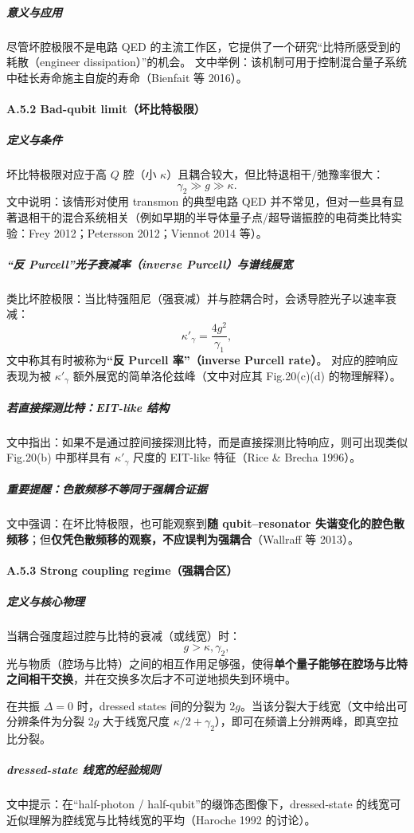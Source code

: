 \documentclass[12pt,a4paper,oneside]{ctexbook}
\let\oldparagraph\paragraph
\renewcommand{\paragraph}[1]{\oldparagraph{#1}\mbox{}}
\let\oldsubparagraph\subparagraph
\renewcommand{\subparagraph}[1]{\oldsubparagraph{#1}\mbox{}}
\begin{document}
\subparagraph{意义与应用}
尽管坏腔极限不是电路 QED 的主流工作区，它提供了一个研究“比特所感受到的耗散（engineer dissipation）”的机会。
文中举例：该机制可用于控制混合量子系统中硅长寿命施主自旋的寿命（Bienfait 等 2016）。

\paragraph{A.5.2 Bad-qubit limit（坏比特极限）}
\subparagraph{定义与条件}
坏比特极限对应于高 $Q$ 腔（小 $\kappa$）且耦合较大，但比特退相干/弛豫率很大：
\[
\gamma_2 \gg g \gg \kappa.
\]
文中说明：该情形对使用 transmon 的典型电路 QED 并不常见，但对一些具有显著退相干的混合系统相关（例如早期的半导体量子点/超导谐振腔的电荷类比特实验：Frey 2012；Petersson 2012；Viennot 2014 等）。

\subparagraph{“反 Purcell”光子衰减率（inverse Purcell）与谱线展宽}
类比坏腔极限：当比特强阻尼（强衰减）并与腔耦合时，会诱导腔光子以速率衰减：
\[
\kappa'_\gamma=\frac{4g^2}{\gamma_1},
\]
文中称其有时被称为\textbf{“反 Purcell 率”（inverse Purcell rate）}。
对应的腔响应表现为被 $\kappa'_\gamma$ 额外展宽的简单洛伦兹峰（文中对应其 Fig.20(c)(d) 的物理解释）。

\subparagraph{若直接探测比特：EIT-like 结构}
文中指出：如果不是通过腔间接探测比特，而是直接探测比特响应，则可出现类似 Fig.20(b) 中那样具有 $\kappa'_\gamma$ 尺度的 EIT-like 特征（Rice \& Brecha 1996）。

\subparagraph{重要提醒：色散频移不等同于强耦合证据}
文中强调：在坏比特极限，也可能观察到\textbf{随 qubit--resonator 失谐变化的腔色散频移}；但\textbf{仅凭色散频移的观察，不应误判为强耦合}（Wallraff 等 2013）。

\paragraph{A.5.3 Strong coupling regime（强耦合区）}
\subparagraph{定义与核心物理}
当耦合强度超过腔与比特的衰减（或线宽）时：
\[
g>\kappa,\gamma_2,
\]
光与物质（腔场与比特）之间的相互作用足够强，使得\textbf{单个量子能够在腔场与比特之间相干交换}，并在交换多次后才不可逆地损失到环境中。

在共振 $\Delta=0$ 时，dressed states 间的分裂为 $2g$。当该分裂大于线宽（文中给出可分辨条件为分裂 $2g$ 大于线宽尺度 $\kappa/2+\gamma_2$），即可在频谱上分辨两峰，即真空拉比分裂。

\subparagraph{dressed-state 线宽的经验规则}
文中提示：在“half-photon / half-qubit”的缀饰态图像下，dressed-state 的线宽可近似理解为腔线宽与比特线宽的平均（Haroche 1992 的讨论）。
\end{document}
